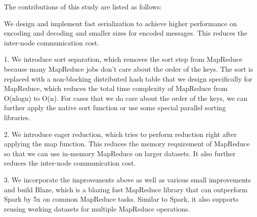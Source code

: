 \documentclass{sigkddExp}
\begin{document}
The contributions of this study are listed as follows:

We design and implement fast serialization to achieve higher performance on encoding and decoding and smaller sizes for encoded messages. This reduces the inter-node communication cost.

1. We introduce sort separation, which removes the sort step from MapReduce because many MapReduce jobs don't care about the order of the keys. The sort is replaced with a non-blocking distributed hash table that we design specifically for MapReduce, which reduces the total time complexity of MapReduce from O(nlogn) to O(n). For cases that we do care about the order of the keys, we can further apply the native sort function or use some special parallel sorting libraries.

2. We introduce eager reduction, which tries to perform reduction right after applying the map function. This reduces the memory requirement of MapReduce so that we can use in-memory MapReduce on larger datasets. It also further reduces the inter-node communication cost.

3. We incorporate the improvements above as well as various small improvements and build Blaze, which is a blazing fast MapReduce library that can outperform Spark by 5x on common MapReduce tasks. Similar to Spark, it also supports reusing working datasets for multiple MapReduce operations.
\end{document}
